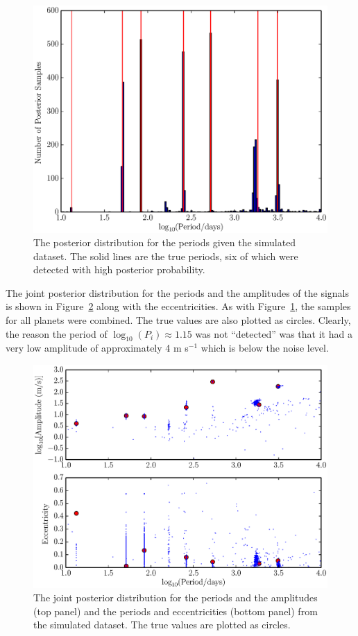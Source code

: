 \documentclass[useAMS,usenatbib]{mn2e}
\begin{document}
\begin{figure}
\includegraphics[scale=0.4]{Figures/fake_data_periods.eps}
\caption{The posterior distribution for the periods given the simulated
dataset. The solid lines are the true periods, six of which were detected
with high posterior probability.\label{fig:fake_data_periods}}
\end{figure}

The joint posterior distribution for the periods and the amplitudes of the
signals is shown in Figure~\ref{fig:fake_data_posterior} along with the
eccentricities. As with Figure~\ref{fig:fake_data_periods}, the samples for
all planets were combined. The true values are also plotted as circles. Clearly, the
reason the period of $\log_{10}(P_i) \approx 1.15$ was not ``detected'' was that
it had a very low amplitude of approximately 4 m s$^{-1}$ which is below the
noise level.

\begin{figure}
\includegraphics[scale=0.4]{Figures/fake_data_posterior.eps}
\caption{The joint posterior distribution for the periods and the amplitudes
(top panel) and the periods and eccentricities (bottom panel) from the
simulated dataset. The true values are plotted as circles.
\label{fig:fake_data_posterior}}
\end{figure}
\end{document}
